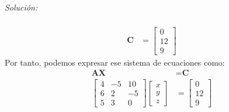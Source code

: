 \documentclass[12pt]{article}
\newenvironment{sol}
    {\emph{Solución:}
    }
    {
    }
\begin{document}
\begin{sol}
\begin{align*}
\\
\textbf{C} &= 
\begin{bmatrix}
0\\
12\\
9
\end{bmatrix}
\end{align*}
Por tanto, podemos expresar ese sistema de ecuaciones como: 
\begin{align*}
\textbf{AX} &= \textbf{C} \\
\begin{bmatrix}
4 & -5 & 10 \\
6 & 2 & -5 \\
5 & 3 & 0 
\end{bmatrix} 
\begin{bmatrix}
x \\
y\\
z
\end{bmatrix}
&=
\begin{bmatrix}
0\\
12\\
9
\end{bmatrix}
\end{align*}


\end{sol}
\end{document}
